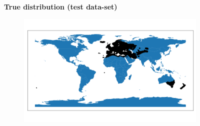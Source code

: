 \vspace{-2ex}
\begin{figure}[hbt!]

\centering
\vspace*{-1ex}  
\begin{center}
\textbf{True distribution (test data-set)}
\end{center}
\vspace*{-1ex}
\begin{subfigure}{.3\linewidth}
  \includegraphics[width=\linewidth]{Images/turdus_true.png}
\end{subfigure} 
\vspace{-3ex}


\end{figure}
